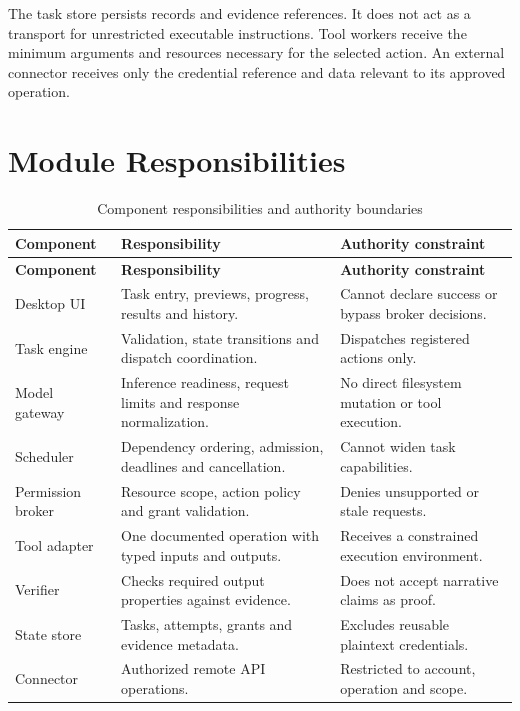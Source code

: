 The task store persists records and evidence references. It does not act as a transport for unrestricted executable instructions. Tool workers receive the minimum arguments and resources necessary for the selected action. An external connector receives only the credential reference and data relevant to its approved operation.

\section{Module Responsibilities}
\begin{longtable}{P{29mm}P{68mm}P{41mm}}
\caption{Component responsibilities and authority boundaries}\\
\toprule\textbf{Component} & \textbf{Responsibility} & \textbf{Authority constraint}\\\midrule\endfirsthead
\toprule\textbf{Component} & \textbf{Responsibility} & \textbf{Authority constraint}\\\midrule\endhead
Desktop UI & Task entry, previews, progress, results and history. & Cannot declare success or bypass broker decisions.\\
Task engine & Validation, state transitions and dispatch coordination. & Dispatches registered actions only.\\
Model gateway & Inference readiness, request limits and response normalization. & No direct filesystem mutation or tool execution.\\
Scheduler & Dependency ordering, admission, deadlines and cancellation. & Cannot widen task capabilities.\\
Permission broker & Resource scope, action policy and grant validation. & Denies unsupported or stale requests.\\
Tool adapter & One documented operation with typed inputs and outputs. & Receives a constrained execution environment.\\
Verifier & Checks required output properties against evidence. & Does not accept narrative claims as proof.\\
State store & Tasks, attempts, grants and evidence metadata. & Excludes reusable plaintext credentials.\\
Connector & Authorized remote API operations. & Restricted to account, operation and scope.\\\bottomrule
\end{longtable}

